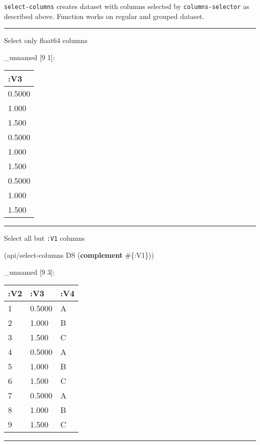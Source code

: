 \documentclass[]{article}
\newenvironment{Shaded}{\begin{snugshade}}{\end{snugshade}}
\newcommand{\KeywordTok}[1]{\textcolor[rgb]{0.13,0.29,0.53}{\textbf{#1}}}
\newcommand{\VariableTok}[1]{\textcolor[rgb]{0.00,0.00,0.00}{#1}}
\newcommand{\AttributeTok}[1]{\textcolor[rgb]{0.77,0.63,0.00}{#1}}
\newcommand{\NormalTok}[1]{#1}
\begin{document}
\texttt{select-columns} creates dataset with columns selected by
\texttt{columns-selector} as described above. Function works on regular
and grouped dataset.

\begin{center}\rule{0.5\linewidth}{0.5pt}\end{center}

Select only float64 columns

\begin{Shaded}
\end{Shaded}

\_unnamed {[}9 1{]}:

\begin{longtable}[]{@{}l@{}}
\toprule
:V3\tabularnewline
\midrule
\endhead
0.5000\tabularnewline
1.000\tabularnewline
1.500\tabularnewline
0.5000\tabularnewline
1.000\tabularnewline
1.500\tabularnewline
0.5000\tabularnewline
1.000\tabularnewline
1.500\tabularnewline
\bottomrule
\end{longtable}

\begin{center}\rule{0.5\linewidth}{0.5pt}\end{center}

Select all but \texttt{:V1} columns

\begin{Shaded}
\begin{Highlighting}[]
\NormalTok{(api/select-columns DS (}\KeywordTok{complement}\NormalTok{ #\{}\AttributeTok{:V1}\NormalTok{\}))}
\end{Highlighting}
\end{Shaded}

\_unnamed {[}9 3{]}:

\begin{longtable}[]{@{}lll@{}}
\toprule
:V2 & :V3 & :V4\tabularnewline
\midrule
\endhead
1 & 0.5000 & A\tabularnewline
2 & 1.000 & B\tabularnewline
3 & 1.500 & C\tabularnewline
4 & 0.5000 & A\tabularnewline
5 & 1.000 & B\tabularnewline
6 & 1.500 & C\tabularnewline
7 & 0.5000 & A\tabularnewline
8 & 1.000 & B\tabularnewline
9 & 1.500 & C\tabularnewline
\bottomrule
\end{longtable}

\begin{center}\rule{0.5\linewidth}{0.5pt}\end{center}
\end{document}
